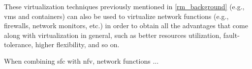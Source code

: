 These virtualization techniques previously mentioned in \autoref{rm_background} (e.g., \glspl{vm} and containers) can also be used to virtualize network functions (e.g., firewalls, network monitors, etc.) in order to obtain all the advantages that come along with virtualization in general, such as better resources utilization, fault-tolerance, higher flexibility, and so on.

When combining \gls{sfc} with \gls{nfv}, network functions ...
